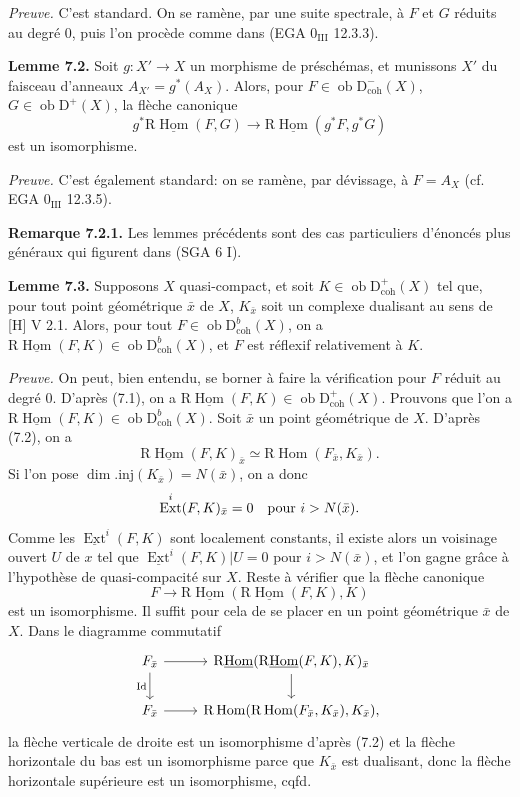 \documentclass[11pt]{article}
\DeclareMathOperator{\Hom}{Hom}
\DeclareMathOperator{\Ext}{Ext}
\newcommand{\R}{\mathrm{R}}
\newcommand{\D}{\mathrm{D}}
\newcommand{\ob}{\operatorname{ob}}
\providecommand{\Hom}{\operatorname{Hom}}
\providecommand{\ob}{\operatorname{ob}}
\providecommand{\R}{\mathrm R}
\begin{document}
\emph{Preuve.} C'est standard. On se ramène, par une suite spectrale, à $F$ et $G$ réduits au degré $0$, puis l'on procède comme dans (EGA $0_{\mathrm{III}}$ 12.3.3).

\textbf{Lemme 7.2.} Soit $g:X'\to X$ un morphisme de préschémas, et munissons $X'$ du faisceau d'anneaux $A_{X'}=g^*(A_X)$. Alors, pour $F\in\ob\D^{-}_{\mathrm{coh}}(X)$, $G\in\ob\D^{+}(X)$, la flèche canonique
\[
        g^*\R\underline{\Hom}(F,G)\longrightarrow \R\underline{\Hom}(g^*F,g^*G)
\]
est un isomorphisme.

\emph{Preuve.} C'est également standard: on se ramène, par dévissage, à $F=A_X$ (cf. EGA $0_{\mathrm{III}}$ 12.3.5).

\textbf{Remarque 7.2.1.} Les lemmes précédents sont des cas particuliers d'énoncés plus généraux qui figurent dans (SGA 6 I).

\textbf{Lemme 7.3.} Supposons $X$ quasi-compact, et soit $K\in\ob\D^{+}_{\mathrm{coh}}(X)$ tel que, pour tout point géométrique $\bar{x}$ de $X$, $K_{\bar{x}}$ soit un complexe dualisant au sens de [H] V 2.1. Alors, pour tout $F\in\ob\D^{b}_{\mathrm{coh}}(X)$, on a $\R\underline{\Hom}(F,K)\in\ob\D^{b}_{\mathrm{coh}}(X)$, et $F$ est réflexif relativement à $K$.

\emph{Preuve.} On peut, bien entendu, se borner à faire la vérification pour $F$ réduit au degré $0$. D'après (7.1), on a $\R\underline{\Hom}(F,K)\in\ob\D^{+}_{\mathrm{coh}}(X)$. Prouvons que l'on a $\R\underline{\Hom}(F,K)\in\ob\D^{b}_{\mathrm{coh}}(X)$. Soit $\bar{x}$ un point géométrique de $X$. D'après (7.2), on a
\[
        \R\underline{\Hom}(F,K)_{\bar{x}}\simeq \R\Hom(F_{\bar{x}},K_{\bar{x}}).
\]
Si l'on pose $\dim.\mathrm{inj}(K_{\bar{x}})=N(\bar{x})$, on a donc
\[
        \Ext^i(F,K)_{\bar{x}}=0\quad\hbox{pour }i>N(\bar{x}).
\]
Comme les $\underline{\Ext}^{i}(F,K)$ sont localement constants, il existe alors un voisinage ouvert $U$ de $x$ tel que $\underline{\Ext}^{i}(F,K)|U=0$ pour $i>N(\bar{x})$, et l'on gagne grâce à l'hypothèse de quasi-compacité sur $X$. Reste à vérifier que la flèche canonique
\[
        F\longrightarrow \R\underline{\Hom}(\R\underline{\Hom}(F,K),K)
\]
est un isomorphisme. Il suffit pour cela de se placer en un point géométrique $\bar{x}$ de $X$. Dans le diagramme commutatif
\[
\begin{tikzcd}
F_{\bar{x}} \arrow[r] \arrow[d,"\mathrm{Id}"'] & \R\underline{\Hom}(\R\underline{\Hom}(F,K),K)_{\bar{x}} \arrow[d]\\
F_{\bar{x}} \arrow[r] & \R\Hom(\R\Hom(F_{\bar{x}},K_{\bar{x}}),K_{\bar{x}}),
\end{tikzcd}
\]
la flèche verticale de droite est un isomorphisme d'après (7.2) et la flèche horizontale du bas est un isomorphisme parce que $K_{\bar{x}}$ est dualisant, donc la flèche horizontale supérieure est un isomorphisme, cqfd.
\end{document}
